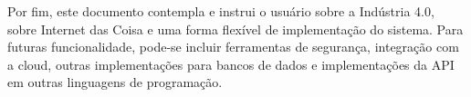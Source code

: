 Por fim, este documento contempla e instrui o usuário sobre a Indústria 4.0, sobre Internet das Coisa e uma forma flexível de implementação do sistema. Para futuras funcionalidade, pode-se incluir ferramentas de segurança, integração com a cloud, outras implementações para bancos de dados e implementações da API em outras linguagens de programação.

\pagebreak



